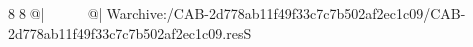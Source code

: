 8  8  @|                                                   @| W   archive:/CAB-2d778ab11f49f33c7c7b502af2ec1c09/CAB-2d778ab11f49f33c7c7b502af2ec1c09.resS 